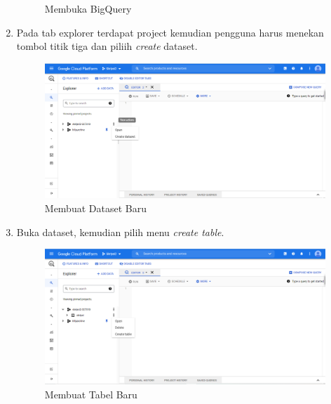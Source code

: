 \begin{enumerate}
\begin{figure}[H]
		\caption{Membuka BigQuery} 
		\label{fig:BQ} 
	\end{figure}
	\item Pada tab explorer terdapat project kemudian pengguna harus menekan tombol titik tiga dan piliih \textit{create} dataset.
	\begin{figure}[H]
		\centering  
		\includegraphics[scale=0.5]{Gambar/create_dataset.PNG}  
		\caption{Membuat Dataset Baru} 
		\label{fig:creat_dataset} 
	\end{figure}
	\item Buka dataset, kemudian pilih menu \textit{create table}.
	\begin{figure}[H]
		\centering  
		\includegraphics[scale=0.5]{Gambar/create_table.PNG}  
		\caption{Membuat Tabel Baru} 
		\label{fig:create_table} 
	\end{figure}
\end{enumerate}

